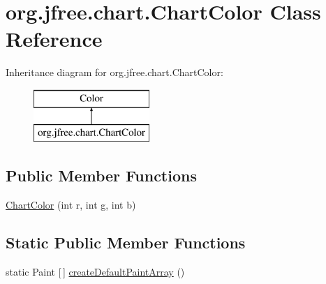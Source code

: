 \hypertarget{classorg_1_1jfree_1_1chart_1_1_chart_color}{}\section{org.\+jfree.\+chart.\+Chart\+Color Class Reference}
\label{classorg_1_1jfree_1_1chart_1_1_chart_color}
Inheritance diagram for org.\+jfree.\+chart.\+Chart\+Color\+:\begin{figure}[H]
\begin{center}
\leavevmode
\includegraphics[height=2.000000cm]{classorg_1_1jfree_1_1chart_1_1_chart_color}
\end{center}
\end{figure}
\subsection*{Public Member Functions}
\begin{DoxyCompactItemize}
\item 
\mbox{\hyperlink{classorg_1_1jfree_1_1chart_1_1_chart_color_ab65176be2d08363f28e9de388b12b2d7}{Chart\+Color}} (int r, int g, int b)
\end{DoxyCompactItemize}
\subsection*{Static Public Member Functions}
\begin{DoxyCompactItemize}
\item 
static Paint \mbox{[}$\,$\mbox{]} \mbox{\hyperlink{classorg_1_1jfree_1_1chart_1_1_chart_color_af436c491352218d70ac2fba2583ab32c}{create\+Default\+Paint\+Array}} ()
\end{DoxyCompactItemize}
